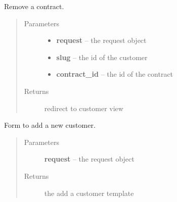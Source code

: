 \documentclass[letterpaper,10pt,english]{sphinxmanual}
\begin{document}

\begin{fulllineitems}
\label{api/system:limeade.system.views.contract_delete}
Remove a contract.
\begin{quote}\begin{description}
\item[{Parameters}] \leavevmode\begin{itemize}
\item {} 
\textbf{request} -- the request object

\item {} 
\textbf{slug} -- the id of the customer

\item {} 
\textbf{contract\_id} -- the id of the contract

\end{itemize}

\item[{Returns}] \leavevmode
redirect to customer view

\end{description}\end{quote}

\end{fulllineitems}


\begin{fulllineitems}
\label{api/system:limeade.system.views.customer_add}
Form to add a new customer.
\begin{quote}\begin{description}
\item[{Parameters}] \leavevmode
\textbf{request} -- the request object

\item[{Returns}] \leavevmode
the add a customer template

\end{description}\end{quote}

\end{fulllineitems}

\end{document}
